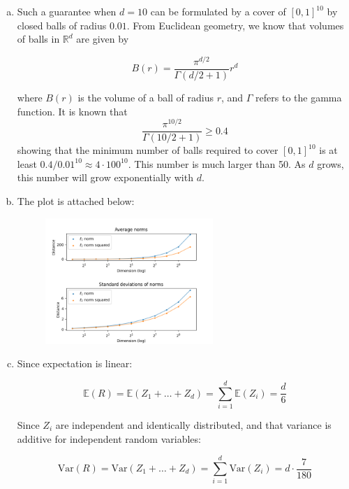 \documentclass{article}
\newcommand{\R}{\mathbb{R}}
\begin{document}
\begin{enumerate}[(a)]
\begin{proof}
        which is a contradiction. Thus, we must have that $x \in [0.01 \cdot (2n + 1) - 0.01, 0.01 \cdot (2n + 1) + 0.01]$ or $x \in [0.01 \cdot (2n + 3) - 0.01, 0.01 \cdot (2n + 3) + 0.01]$. Thus, we have that $x$ is within $0.01$ of some point in $S$.
    \end{proof}

    \item Such a guarantee when $d = 10$ can be formulated by a cover of $[0, 1]^{10}$ by closed balls of radius $0.01$. From Euclidean geometry, we know that volumes of balls in $\R^d$ are given by 
    
    \[B(r) = \frac{\pi^{d/2}}{\Gamma(d/2 + 1)} r^d\]

    where $B(r)$ is the volume of a ball of radius $r$, and $\Gamma$ refers to the gamma function. It is known that \[\dfrac{\pi^{10/2}}{\Gamma(10/2 + 1)} \geq 0.4\] showing that the minimum number of balls required to cover $[0, 1]^{10}$ is at least $0.4 / 0.01^{10} \approx 4 \cdot 100^{10}$. This number is much larger than 50. As $d$ grows, this number will grow exponentially with $d$. 

    \item The plot is attached below:
    
    \begin{figure}[H]
        \centering
        \includegraphics[width=0.6\textwidth]{../q1/figures/output.png}
        \label{fig:q1c}
    \end{figure}

    \item Since expectation is linear:
    
    \[\mathbb{E}(R) = \mathbb{E}(Z_1 + \dots + Z_d) = \sum_{i = 1}^d \mathbb{E}(Z_i) = \frac{d}{6}\]

    Since $Z_i$ are independent and identically distributed, and that variance is additive for independent random variables:

    \[\text{Var}(R) = \text{Var}(Z_1 + \dots + Z_d) = \sum_{i = 1}^d \text{Var}(Z_i) = d \cdot \frac{7}{180}\]


\end{enumerate}
\end{document}
